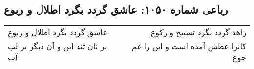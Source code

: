 \begin{center}
\section*{رباعی شماره ۱۰۵۰: عاشق گردد بگرد اطلال و ربوع}
\label{sec:1050}
\begin{longtable}{l p{0.5cm} r}
عاشق گردد بگرد اطلال و ربوع
&&
زاهد گردد بگرد تسبیح و رکوع
\\
بر نان تند این و آن دیگر بر لب آب
&&
کانرا عطش آمده است و این را غم جوع
\\
\end{longtable}
\end{center}
